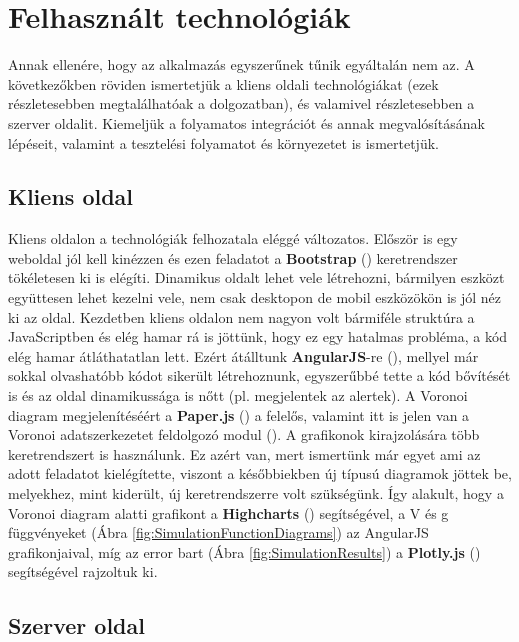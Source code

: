 \section{Felhasznált technológiák}

Annak ellenére, hogy az alkalmazás egyszerűnek tűnik egyáltalán nem az. A következőkben röviden ismertetjük a kliens oldali technológiákat (ezek részletesebben megtalálhatóak a \cite{reka2017ubb} dolgozatban), és valamivel részletesebben a szerver oldalit. Kiemeljük a folyamatos integrációt és annak megvalósításának lépéseit, valamint a tesztelési folyamatot és környezetet is ismertetjük.

\subsection{Kliens oldal}

Kliens oldalon a technológiák felhozatala eléggé változatos. Először is egy weboldal jól kell kinézzen és ezen feladatot a \textbf{Bootstrap} (\cite{soft:bootstrap}) keretrendszer tökéletesen ki is elégíti. Dinamikus oldalt lehet vele létrehozni, bármilyen eszközt együttesen lehet kezelni vele, nem csak desktopon de mobil eszközökön is jól néz ki az oldal. Kezdetben kliens oldalon nem nagyon volt bármiféle struktúra a JavaScriptben és elég hamar rá is jöttünk, hogy ez egy hatalmas probléma, a kód elég hamar átláthatatlan lett. Ezért átálltunk \textbf{AngularJS}-re (\cite{soft:angular}), mellyel már sokkal olvashatóbb kódot sikerült létrehoznunk, egyszerűbbé tette a kód bővítését is és az oldal dinamikussága is nőtt (pl. megjelentek az alertek). A Voronoi diagram megjelenítéséért a \textbf{Paper.js} (\cite{soft:paper}) a felelős, valamint itt is jelen van a Voronoi adatszerkezetet feldolgozó modul (\cite{soft:voronoiModule}). A grafikonok kirajzolására több keretrendszert is használunk. Ez azért van, mert ismertünk már egyet ami az adott feladatot kielégítette, viszont a későbbiekben új típusú diagramok jöttek be, melyekhez, mint kiderült, új keretrendszerre volt szükségünk. Így alakult, hogy a Voronoi diagram alatti grafikont a \textbf{Highcharts} (\cite{soft:highcharts}) segítségével, a V és g függvényeket (Ábra \ref{fig:SimulationFunctionDiagrams}) az AngularJS grafikonjaival, míg az error bart (Ábra \ref{fig:SimulationResults}) a \textbf{Plotly.js} (\cite{soft:plotly}) segítségével rajzoltuk ki.

\subsection{Szerver oldal}

